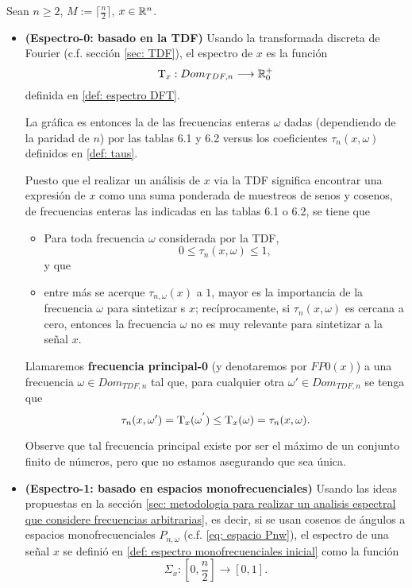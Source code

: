 Sean $n \geq 2$, $M := \lceil \frac{n}{2} \rceil$, $x \in \mathbb{R}^{n}$.
\begin{itemize}
	\item \textbf{(Espectro-0: basado en la TDF)} 
	Usando la transformada discreta de Fourier
	(c.f. sección \ref{sec: TDF}),
	el espectro de $x$ es la función
	\[
	\mathrm{T}_{x}: Dom_{TDF, n} \longrightarrow \mathbb{R}^{+}_{0}
	\]	
	definida en \ref{def: espectro DFT}.
	
	La gráfica es entonces la de las frecuencias
	enteras $\omega$ dadas (dependiendo de la 
	paridad de $n$) por las
	tablas 6.1 y 6.2
	versus los coeficientes
	$\tau_{n}(x, \omega)$ definidos en
	\ref{def: taus}.
	
	Puesto que el realizar un análisis de 
	$x$ via la TDF significa encontrar una
	expresión de $x$ como una suma
	ponderada de muestreos de senos y cosenos,
	de frecuencias enteras las indicadas en las tablas 6.1 o 6.2,
	se tiene que  
	\begin{itemize}
		\item Para toda frecuencia $\omega$ considerada
		por la TDF,
		\[
		0 \leq \tau_{n}(x, \omega) \leq 1,
		\]
		y que
		\item entre más se acerque
		$\tau_{n, \omega}(x)$
		a $1$, mayor es la
		importancia de la frecuencia $\omega$ para
		sintetizar s $x$; recíprocamente, si 
		$\tau_{n}(x, \omega)$ es cercana a cero, entonces
		la frecuencia $\omega$ no es muy relevante para 
		sintetizar a la señal $x$.
	\end{itemize}
	\begin{defi}
	\label{def: FM0}
	Llamaremos \textbf{frecuencia principal-0}
	(y denotaremos por $FP0(x)$) 
	a una 
	frecuencia $\omega \in Dom_{TDF, n}$
	tal que, para cualquier otra $\omega' \in Dom_{TDF, n}$ 
	se tenga que 
	\[
	\tau_{n}(x, \omega') = \mathrm{T}_{x}(\omega^{'}) \leq
	\mathrm{T}_{x}(\omega) =  
	 \tau_{n}(x, \omega).
	\]
	\end{defi}
	Observe que tal frecuencia principal existe por ser 
	el máximo de un conjunto finito de números, pero que no 
	estamos asegurando que sea única. 
	
	\item \textbf{(Espectro-1: basado en espacios monofrecuenciales)} 
	Usando
	las ideas propuestas en 
	la sección
	\ref{sec: metodologia para realizar un analisis espectral que considere frecuencias arbitrarias}, 
	es decir, si se usan cosenos de ángulos a
	espacios monofrecuenciales $P_{n, \omega}$
	(c.f. \ref{eq: espacio Pnw}), el espectro
	de una señal $x$ se definió en
	\ref{def: espectro monofrecuenciales inicial}
	como la función 
	\[
	\Sigma_{x} : \left[0, \frac{n}{2} \right] \longrightarrow [0,1].
	\]
	

\end{itemize}
